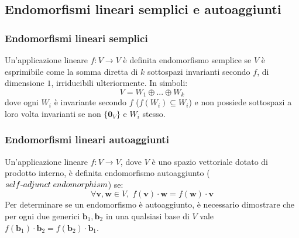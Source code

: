 \vspace{10pt}
\subsection{Endomorfismi lineari semplici e autoaggiunti} \label{subsec:linappend}
    \subsubsection{Endomorfismi lineari semplici} \label{subsubsec:linappsimpleend}
    Un'applicazione lineare $f : V \rightarrow V$ è definita endomorfismo semplice se $V$ è esprimibile come la somma diretta di $k$ sottospazi invarianti secondo $f$, di dimensione $1$, irriducibili ulteriormente. In simboli:
    \[
        V = W_1 \oplus ... \oplus W_k
    \]
    dove ogni $W_i$ è invariante secondo $f$ ($f(W_i) \subseteq W_i$) e non possiede sottospazi a loro volta invarianti se non $\{\mathbf{0}_V\}$ e $W_i$ stesso.

    \vspace{10pt}
    \subsubsection{Endomorfismi lineari autoaggiunti} \label{subsubsec:linappsadjend}
    Un'applicazione lineare $f: V \rightarrow V$, dove $V$ è uno spazio vettoriale dotato di prodotto interno, è definita endomorfismo autoaggiunto ($self \textnormal{-} adjunct \; endomorphism$) se:
    \[
        \forall \mathbf{v}, \mathbf{w} \in V, \; f(\mathbf{v}) \cdot \mathbf{w} = f(\mathbf{w}) \cdot \mathbf{v}
    \]
    Per determinare se un endomorfismo è autoaggiunto, è necessario dimostrare che per ogni due generici $\mathbf{b}_{1}, \mathbf{b}_{2}$ in una qualsiasi base di $V$ vale
    $f(\mathbf{b}_{1}) \cdot \mathbf{b}_{2} = f(\mathbf{b}_{2}) \cdot \mathbf{b}_{1}$.

